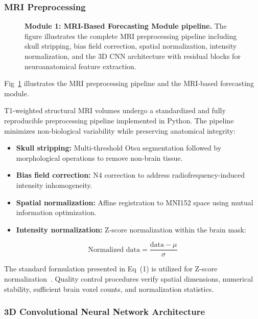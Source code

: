 \documentclass[10pt,letterpaper]{article}
\begin{document}
\subsubsection*{\textbf{MRI Preprocessing}}

\begin{figure}[!h]
\caption{\textbf{Module 1: MRI-Based Forecasting Module pipeline.}
The figure illustrates the complete MRI preprocessing pipeline including skull stripping, bias field correction, spatial normalization, intensity normalization, and the 3D CNN architecture with residual blocks for neuroanatomical feature extraction.}
\label{fig:module1}
\end{figure}

Fig~\ref{fig:module1} illustrates the MRI preprocessing pipeline and the MRI-based forecasting module.

T1-weighted structural MRI volumes undergo a standardized and fully reproducible preprocessing pipeline implemented in Python. The pipeline minimizes non-biological variability while preserving anatomical integrity:
\begin{itemize}
    \item \textbf{Skull stripping:} Multi-threshold Otsu segmentation followed by morphological operations to remove non-brain tissue.
    \item \textbf{Bias field correction:} N4 correction to address radiofrequency-induced intensity inhomogeneity.
    \item \textbf{Spatial normalization:} Affine registration to MNI152 space using mutual information optimization.
    \item \textbf{Intensity normalization:} Z-score normalization within the brain mask:
\end{itemize}

\begin{equation}
\text{Normalized data} = \frac{\text{data} - \mu}{\sigma}
\end{equation}

The standard formulation presented in Eq~(1) is utilized for Z-score normalization~\cite{ref47}. Quality control procedures verify spatial dimensions, numerical stability, sufficient brain voxel counts, and normalization statistics.

\subsubsection*{\textbf{3D Convolutional Neural Network Architecture}}
\end{document}
